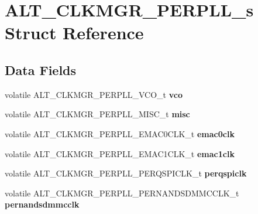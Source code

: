 \hypertarget{structALT__CLKMGR__PERPLL__s}{}\section{A\+L\+T\+\_\+\+C\+L\+K\+M\+G\+R\+\_\+\+P\+E\+R\+P\+L\+L\+\_\+s Struct Reference}
\label{structALT__CLKMGR__PERPLL__s}
\subsection*{Data Fields}
\begin{DoxyCompactItemize}
\item 
\mbox{\label{structALT__CLKMGR__PERPLL__s_af4f64d971cc2fd262a608439e6f7b6e4}} 
volatile A\+L\+T\+\_\+\+C\+L\+K\+M\+G\+R\+\_\+\+P\+E\+R\+P\+L\+L\+\_\+\+V\+C\+O\+\_\+t {\bfseries vco}
\item 
\mbox{\label{structALT__CLKMGR__PERPLL__s_a9542037e7a080b056d5c8c443c70deb5}} 
volatile A\+L\+T\+\_\+\+C\+L\+K\+M\+G\+R\+\_\+\+P\+E\+R\+P\+L\+L\+\_\+\+M\+I\+S\+C\+\_\+t {\bfseries misc}
\item 
\mbox{\label{structALT__CLKMGR__PERPLL__s_a9e2014238ad777a2e8c0bdc53c2468a2}} 
volatile A\+L\+T\+\_\+\+C\+L\+K\+M\+G\+R\+\_\+\+P\+E\+R\+P\+L\+L\+\_\+\+E\+M\+A\+C0\+C\+L\+K\+\_\+t {\bfseries emac0clk}
\item 
\mbox{\label{structALT__CLKMGR__PERPLL__s_a67c905a817049bcb5cc69a73ed87c181}} 
volatile A\+L\+T\+\_\+\+C\+L\+K\+M\+G\+R\+\_\+\+P\+E\+R\+P\+L\+L\+\_\+\+E\+M\+A\+C1\+C\+L\+K\+\_\+t {\bfseries emac1clk}
\item 
\mbox{\label{structALT__CLKMGR__PERPLL__s_a39356363daf03e9e8f7307dd5ef3f058}} 
volatile A\+L\+T\+\_\+\+C\+L\+K\+M\+G\+R\+\_\+\+P\+E\+R\+P\+L\+L\+\_\+\+P\+E\+R\+Q\+S\+P\+I\+C\+L\+K\+\_\+t {\bfseries perqspiclk}
\item 
\mbox{\label{structALT__CLKMGR__PERPLL__s_ac90e59b8e0b202607d44f5dd035c720f}} 
volatile A\+L\+T\+\_\+\+C\+L\+K\+M\+G\+R\+\_\+\+P\+E\+R\+P\+L\+L\+\_\+\+P\+E\+R\+N\+A\+N\+D\+S\+D\+M\+M\+C\+C\+L\+K\+\_\+t {\bfseries pernandsdmmcclk}
\item 

\end{DoxyCompactItemize}
